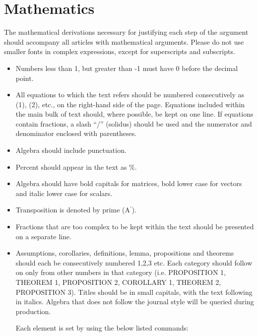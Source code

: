 \documentclass{OUP-EJ}
\begin{document}
\section{Mathematics}
The mathematical derivations necessary for justifying each step of the argument should
accompany all articles with mathematical arguments.
Please do not use smaller fonts in complex expressions, except for superscripts and subscripts.
\begin{itemize}
\item Numbers less than 1, but greater than -1 must have 0 before the decimal point.

\item  All equations to which the text refers should be numbered consecutively as (1), (2), etc., on
the right-hand side of the page. Equations included within the main bulk of text should,
where possible, be kept on one line. If equations contain fractions, a slash “/” (solidus)
should be used and the numerator and denominator enclosed with parentheses.

\item  Algebra should include punctuation.
\item  Percent should appear in the text as \%.
\item  Algebra should have bold capitals for matrices, bold lower case for vectors and italic
lower case for scalars.
\item  Transposition is denoted by prime (A$^\prime$).
\item  Fractions that are too complex to be kept within the text should be presented on a
separate line.

\item  Assumptions, corollaries, definitions, lemma, propositions and theorems should
each be consecutively numbered 1,2,3 etc. Each category should follow on only from
other numbers in that category (i.e. PROPOSITION 1, THEOREM 1, PROPOSITION 2,
COROLLARY 1, THEOREM 2, PROPOSITION 3). Titles should be in small capitals, with
the text following in italics. Algebra that does not follow the journal style will be queried
during production.

Each element is set by using the below listed commands:


\end{itemize}
\end{document}

